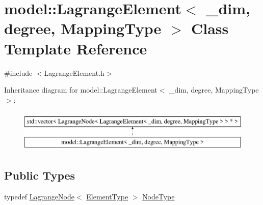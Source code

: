 \hypertarget{classmodel_1_1_lagrange_element}{}\section{model\+:\+:Lagrange\+Element$<$ \+\_\+dim, degree, Mapping\+Type $>$ Class Template Reference}
\label{classmodel_1_1_lagrange_element}


{\ttfamily \#include $<$Lagrange\+Element.\+h$>$}

Inheritance diagram for model\+:\+:Lagrange\+Element$<$ \+\_\+dim, degree, Mapping\+Type $>$\+:\begin{figure}[H]
\begin{center}
\leavevmode
\includegraphics[height=2.000000cm]{classmodel_1_1_lagrange_element}
\end{center}
\end{figure}
\subsection*{Public Types}
\begin{DoxyCompactItemize}
\item 
typedef \hyperlink{structmodel_1_1_lagrange_node}{Lagrange\+Node}$<$ \hyperlink{classmodel_1_1_lagrange_element}{Element\+Type} $>$ \hyperlink{classmodel_1_1_lagrange_element_a112bda9c061442a6c52f06c61e3ab123}{Node\+Type}
\end{DoxyCompactItemize}
